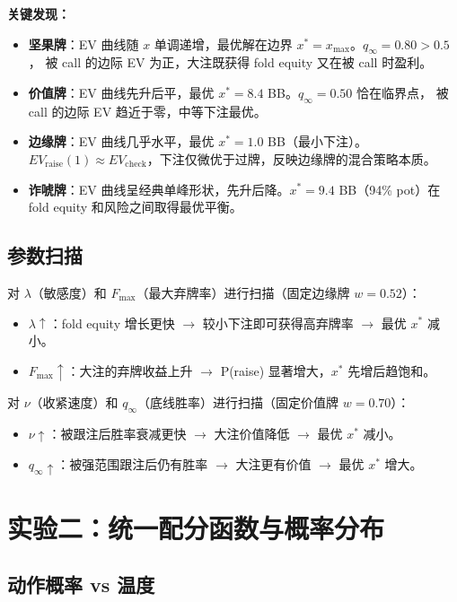 \documentclass[12pt,a4paper]{ctexart}
\begin{document}
\textbf{关键发现：}
\begin{itemize}
    \item \textbf{坚果牌}：EV 曲线随 $x$ 单调递增，最优解在边界 $x^* = x_{\max}$。$q_{\infty}=0.80 > 0.5$，
          被 call 的边际 EV 为正，大注既获得 fold equity 又在被 call 时盈利。
    \item \textbf{价值牌}：EV 曲线先升后平，最优 $x^* = 8.4$ BB。$q_{\infty}=0.50$ 恰在临界点，
          被 call 的边际 EV 趋近于零，中等下注最优。
    \item \textbf{边缘牌}：EV 曲线几乎水平，最优 $x^* = 1.0$ BB（最小下注）。
          $EV_{\text{raise}}(1) \approx EV_{\text{check}}$，下注仅微优于过牌，反映边缘牌的混合策略本质。
    \item \textbf{诈唬牌}：EV 曲线呈经典单峰形状，先升后降。$x^* = 9.4$ BB（94\% pot）在 fold equity
          和风险之间取得最优平衡。
\end{itemize}

\subsection{参数扫描}

对 $\lambda$（敏感度）和 $F_{\max}$（最大弃牌率）进行扫描（固定边缘牌 $w=0.52$）：
\begin{itemize}
    \item $\lambda \uparrow$：fold equity 增长更快 $\to$ 较小下注即可获得高弃牌率 $\to$ 最优 $x^*$ 减小。
    \item $F_{\max} \uparrow$：大注的弃牌收益上升 $\to$ P(raise) 显著增大，$x^*$ 先增后趋饱和。
\end{itemize}

对 $\nu$（收紧速度）和 $q_{\infty}$（底线胜率）进行扫描（固定价值牌 $w=0.70$）：
\begin{itemize}
    \item $\nu \uparrow$：被跟注后胜率衰减更快 $\to$ 大注价值降低 $\to$ 最优 $x^*$ 减小。
    \item $q_{\infty} \uparrow$：被强范围跟注后仍有胜率 $\to$ 大注更有价值 $\to$ 最优 $x^*$ 增大。
\end{itemize}

\section{实验二：统一配分函数与概率分布}

\subsection{动作概率 vs 温度}
\end{document}
